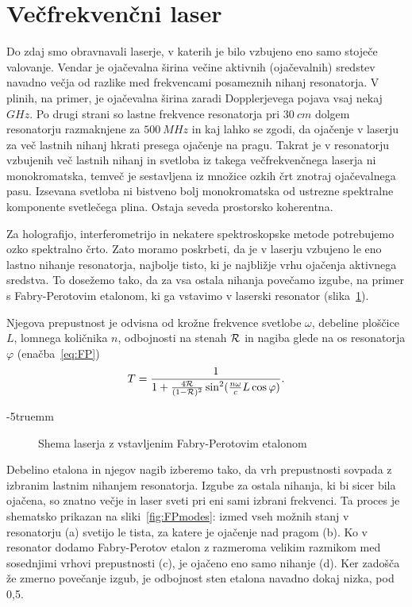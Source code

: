 \section{Večfrekvenčni laser}
Do zdaj smo obravnavali laserje, v katerih je bilo vzbujeno eno samo stoječe
valovanje. Vendar je ojačevalna širina večine aktivnih (ojačevalnih) sredstev 
navadno večja od razlike med frekvencami posameznih 
nihanj resonatorja. V plinih, na primer, je ojačevalna širina zaradi 
Dopplerjevega pojava vsaj nekaj $\si{GHz}$. Po drugi strani so lastne frekvence resonatorja 
pri $30~\si{cm}$ dolgem resonatorju razmaknjene za $500~\si{MHz}$ in kaj  
lahko se zgodi, da ojačenje v laserju za več lastnih nihanj hkrati 
presega ojačenje na pragu. Takrat je v resonatorju vzbujenih več lastnih nihanj in 
svetloba iz takega večfrekvenčnega laserja ni monokromatska,
temveč je sestavljena iz množice ozkih črt znotraj ojačevalnega pasu.
Izsevana svetloba ni bistveno bolj monokromatska od ustrezne spektralne 
komponente svetlečega plina. Ostaja seveda prostorsko koherentna.

Za holografijo, interferometrijo in nekatere spektroskopske metode
potrebujemo ozko spektralno črto. Zato moramo poskrbeti, da je v laserju vzbujeno le
eno lastno nihanje resonatorja, najbolje tisto, ki je najbližje vrhu ojačenja
aktivnega sredstva. To dosežemo tako, da za vsa ostala nihanja povečamo izgube,
na primer s Fabry-Perotovim etalonom, 
ki ga vstavimo v laserski resonator
(slika~\ref{fig:FPres}). 

Njegova prepustnost je odvisna od krožne frekvence 
svetlobe $\omega$, debeline ploščice $L$, lomnega količnika $n$, odbojnosti na stenah 
${\cal R}$ in nagiba glede na os resonatorja $\varphi$ (enačba~\ref{eq:FP}) 
\begin{equation}
T=\frac{1}{1+\frac{4{\cal {R}}}{(1-{\cal {R}})^{2}}\sin^{2}(\frac{n\omega}{c}L\cos \varphi )}.
\label{5.22}
\end{equation}

\vglue-5truemm
\begin{figure}[h]
\centering
\def\svgwidth{70truemm} 

\caption{Shema laserja z vstavljenim Fabry-Perotovim etalonom}
\label{fig:FPres}
\end{figure}

Debelino etalona in njegov nagib 
izberemo tako, da vrh prepustnosti sovpada z izbranim lastnim nihanjem resonatorja. 
Izgube za ostala nihanja, ki bi sicer bila ojačena, so znatno večje in laser
sveti pri eni sami izbrani frekvenci. Ta proces je shematsko prikazan na 
sliki~\ref{fig:FPmodes}: izmed vseh možnih stanj v resonatorju (a) svetijo le tista, za katere
je ojačenje nad pragom (b). Ko v resonator dodamo Fabry-Perotov etalon z razmeroma velikim
razmikom med sosednjimi vrhovi prepustnosti (c), je ojačeno eno samo nihanje (d). 
Ker zadošča že zmerno povečanje izgub, je odbojnost sten etalona navadno dokaj nizka, 
pod 0,5. 

